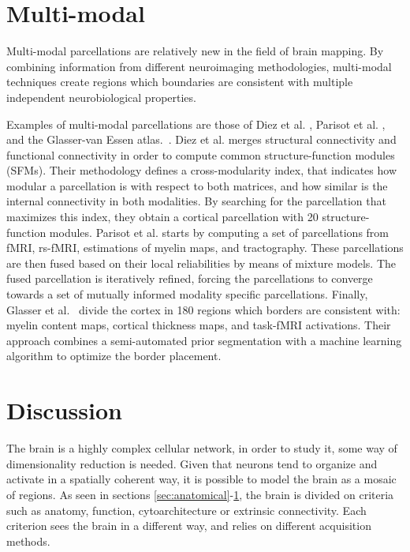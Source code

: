 \section{Multi-modal}
\label{sec:multimodal}
Multi-modal parcellations are relatively new in the field of brain mapping.
By combining information from different neuroimaging methodologies, multi-modal
techniques create regions which boundaries are consistent with multiple
independent neurobiological properties.

Examples of multi-modal parcellations are those of Diez et al. \cite{Diez2014},
Parisot et al. \cite{Parisot2017}, and the Glasser-van Essen atlas.~\cite{Glasser2016}. 
Diez et al. \cite{Diez2014} merges structural connectivity and functional
connectivity in order to compute common structure-function modules (SFMs).
Their methodology defines a cross-modularity index, that indicates how
modular a parcellation is with respect to both matrices, and how similar is the
internal connectivity in both modalities. By searching for the parcellation
that maximizes this index, they obtain a cortical parcellation with 20 structure-function
modules. Parisot et al. \cite{Parisot2017} starts by computing a set of
parcellations from fMRI, rs-fMRI, estimations of myelin maps, and tractography.
These parcellations are then fused based on their local reliabilities by means of
mixture models. The fused parcellation is iteratively refined, forcing 
the parcellations to converge towards a set of mutually informed modality specific
parcellations. Finally, Glasser et al.~\cite{Glasser2016}
divide the cortex in 180 regions which borders are consistent with: 
myelin content maps, cortical thickness maps, and task-fMRI activations. Their
approach combines a semi-automated prior segmentation with a machine learning
algorithm to optimize the border placement.

\section{Discussion}

The brain is a highly complex cellular network, in order to study it, some
way of dimensionality reduction is needed. Given that neurons tend to organize
and activate in a spatially coherent way, it is possible to model the brain as a
mosaic of regions. As seen in sections \ref{sec:anatomical}-\ref{sec:multimodal},
the brain is divided on criteria such as anatomy, function, cytoarchitecture or
extrinsic connectivity. Each criterion sees the brain in a different way, and
relies on different acquisition methods. 

